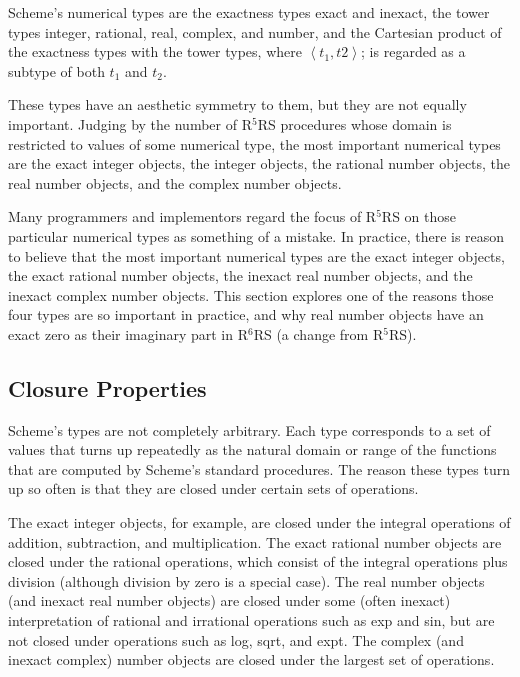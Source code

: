 \documentclass[twoside,twocolumn]{algol60}
\newcommand{\rn}[1]{R$^{#1}$RS}
\begin{document}
Scheme's numerical types are the exactness types exact and inexact,
the tower types integer, rational, real, complex, and number, and the
Cartesian product of the exactness types with the tower types, where
$\left< t_1, t2 \right>$; is regarded as a subtype of both $t_1$ and
$t_2$.

These types have an aesthetic symmetry to them, but they are not
equally important.  Judging by the number of \rn{5} procedures whose
domain is restricted to values of some numerical type, the most
important numerical types are the exact integer objects, the integer objects, the
rational number objects, the real number objects, and the complex
number objects.

Many programmers and implementors regard the focus of \rn{5} on those
particular numerical types as something of a mistake.  In practice,
there is reason to believe that the most important numerical types are
the exact integer objects, the exact rational number objects, the
inexact real number objects, and the
inexact complex number objects.  This section explores one of the reasons
those four types are so important in practice, and why real number objects have an
exact zero as their imaginary part in \rn{6} (a change from \rn{5}).

\subsection{Closure Properties}
\label{closurepropertiessection}

Scheme's types are not completely arbitrary.  Each type corresponds to
a set of values that turns up repeatedly as the natural domain or
range of the functions that are computed by Scheme's standard
procedures.  The reason these types turn up so often is that they are
closed under certain sets of operations.

The exact integer objects, for example, are closed under the integral
operations of addition, subtraction, and multiplication.  The exact
rational number objects are closed under the rational operations, which consist of
the integral operations plus division (although division by zero is a special
case).  The real number objects (and inexact real number objects) are closed
under some (often inexact) interpretation of rational and irrational
operations such as exp and sin, but are not closed under operations
such as {\cf log}, {\cf sqrt}, and {\cf expt}.  The complex (and
inexact complex) number objects are closed under the largest set of
operations.
\end{document}
